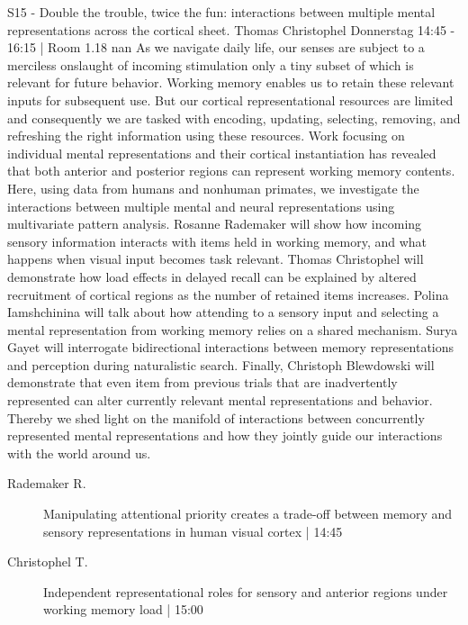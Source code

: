 
            \begin{symposium}
            {S15 - Double the trouble, twice the fun: interactions between multiple mental representations across the cortical sheet.}
            {Thomas Christophel}
            {Donnerstag 14:45 - 16:15 | Room 1.18}
            {nan}
            As we navigate daily life, our senses are subject to a merciless onslaught of incoming stimulation only a tiny subset of which is relevant for future behavior. Working memory enables us to retain these relevant inputs for subsequent use. But our cortical representational resources are limited and consequently we are tasked with encoding, updating, selecting, removing, and refreshing the right information using these resources. Work focusing on individual mental representations and their cortical instantiation has revealed that both anterior and posterior regions can represent working memory contents. Here, using data from humans and nonhuman primates, we investigate the interactions between multiple mental and neural representations using multivariate pattern analysis. Rosanne Rademaker will show how incoming sensory information interacts with items held in working memory, and what happens when visual input becomes task relevant. Thomas Christophel will demonstrate how load effects in delayed recall can be explained by altered recruitment of cortical regions as the number of retained items increases. Polina Iamshchinina will talk about how attending to a sensory input and selecting a mental representation from working memory relies on a shared mechanism. Surya Gayet will interrogate bidirectional interactions between memory representations and perception during naturalistic search. Finally, Christoph Blewdowski will demonstrate that even item from previous trials that are inadvertently represented can alter currently relevant mental representations and behavior. Thereby we shed light on the manifold of interactions between concurrently represented mental representations and how they jointly guide our interactions with the world around us.
            \begin{description}    
            
                \item [ Rademaker R.] Manipulating attentional priority creates a trade-off between memory and sensory representations in human visual cortex  \textcolor{mygray}{ | 14:45}    
                
                \item [ Christophel T.] Independent representational roles for sensory and anterior regions under working memory load  \textcolor{mygray}{ | 15:00}    
                

\end{description}
\end{symposium}
